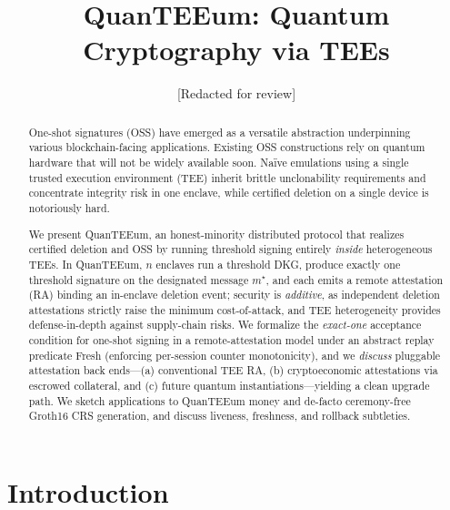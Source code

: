 \documentclass[runningheads,orivec]{llncs}
\newcommand{\prot}{\textsf{QuanTEEum}}
\begin{document}
\title{QuanTEEum: Quantum Cryptography via TEEs}
\author{[Redacted for review]}
\maketitle

\begin{abstract}
One-shot signatures (OSS) have emerged as a versatile abstraction underpinning various blockchain-facing applications. Existing OSS constructions rely on quantum hardware that will not be widely available soon. Naïve emulations using a single trusted execution environment (TEE) inherit brittle unclonability requirements and concentrate integrity risk in one enclave, while certified deletion on a single device is notoriously hard. 

We present \prot{}, an honest-minority distributed protocol that realizes certified deletion and OSS by running threshold signing entirely \emph{inside} heterogeneous TEEs. In \prot{}, $n$ enclaves run a threshold DKG, produce exactly one threshold signature on the designated message $m^{\star}$, and each emits a remote attestation (RA) binding an in-enclave deletion event; security is \emph{additive}, as independent deletion attestations strictly raise the minimum cost-of-attack, and TEE heterogeneity provides defense-in-depth against supply-chain risks. We formalize the \emph{exact-one} acceptance condition for one-shot signing in a remote-attestation model under an abstract replay predicate \textsf{Fresh} (enforcing per-session counter monotonicity), and we \emph{discuss} pluggable attestation back ends—(a) conventional TEE RA, (b) cryptoeconomic attestations via escrowed collateral, and (c) future quantum instantiations—yielding a clean upgrade path. We sketch applications to QuanTEEum money and de-facto ceremony-free Groth16 CRS generation, and discuss liveness, freshness, and rollback subtleties. 
\end{abstract}

\section{Introduction}
\end{document}
